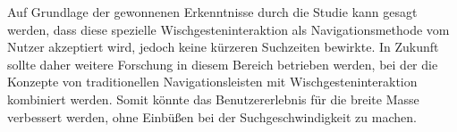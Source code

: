 \documentclass[11pt,a4paper]{report}
\begin{document}
Auf Grundlage der gewonnenen Erkenntnisse durch die Studie kann gesagt werden, dass diese spezielle Wischgesteninteraktion als Navigationsmethode vom Nutzer akzeptiert wird, jedoch keine kürzeren Suchzeiten bewirkte. In Zukunft sollte daher weitere Forschung in diesem Bereich betrieben werden, bei der die Konzepte von traditionellen Navigationsleisten mit Wischgesteninteraktion kombiniert werden. Somit könnte das Benutzererlebnis für die breite Masse verbessert werden, ohne Einbüßen bei der Suchgeschwindigkeit zu machen.



















\clearemptydoublepage
{}

	
\end{document}
